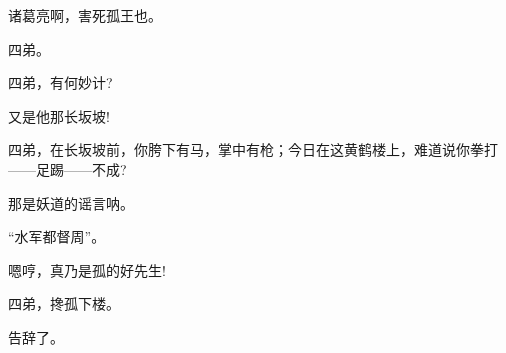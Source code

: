 {

诸葛亮啊，害死孤王也。


四弟。


四弟，有何妙计?

又是他那长坂坡!

四弟，在长坂坡前，你胯下有马，掌中有枪；今日在这黄鹤楼上，难道说你拳打------足踢------不成?

那是妖道的谣言呐。

``水军都督周''。

嗯哼，真乃是孤的好先生!

四弟，搀孤下楼。

告辞了。

}
